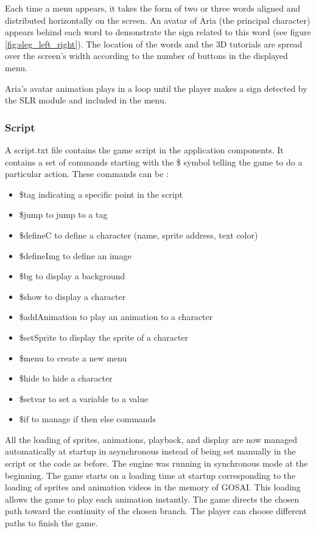 Each time a menu appears, it takes the form of two or three words aligned and distributed horizontally on the screen. An avatar of Aria (the principal character) appears behind each word to demonstrate the sign related to this word (see figure \ref{fig:sleg_left_right}). The location of the words and the 3D tutorials are spread over the screen's width according to the number of buttons in the displayed menu. 

Aria's avatar animation plays in a loop until the player makes a sign detected by the SLR module and included in the menu. 

\subsubsection{Script}

A script.txt file contains the game script in the application components. It contains a set of commands starting with the \$ symbol telling the game to do a particular action. These commands can be :
\begin{itemize}
    \item \$tag indicating a specific point in the script
    \item \$jump to jump to a tag
    \item \$defineC to define a character (name, sprite address, text color)
    \item \$defineImg to define an image
    \item \$bg to display a background
    \item \$show to display a character
    \item \$addAnimation to play an animation to a character
    \item \$setSprite to display the sprite of a character
    \item \$menu to create a new menu
    \item \$hide to hide a character
    \item \$setvar to set a variable to a value
    \item \$if to manage if then else commands
\end{itemize}

All the loading of sprites, animations, playback, and display are now managed automatically at startup in asynchronous instead of being set manually in the script or the code as before. The engine was running in synchronous mode at the beginning. The game starts on a loading time at startup corresponding to the loading of sprites and animation videos in the memory of GOSAI. This loading allows the game to play each animation instantly. The game directs the chosen path toward the continuity of the chosen branch. The player can choose different paths to finish the game.

